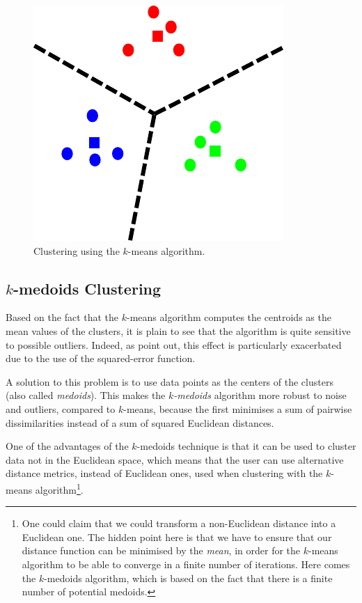 \begin{figure}[ht]
  \centering
  \includegraphics[scale=0.5]{images/kmeans.pdf}
  \caption[Clustering using the $k$-means algorithm]{Clustering using the $k$-means algorithm.}
  \label{images:kmeans}
\end{figure}


\subsection{\texorpdfstring{$k$}{k}-medoids Clustering}
\label{subsec:k-medoids}

Based on the fact that the $k$-means algorithm computes the centroids as the mean values of the clusters, it is plain to see that the algorithm is quite sensitive to possible outliers. Indeed, as  \cite{Han:2011} point out, this effect is particularly exacerbated due to the use of the squared-error function.

A solution to this problem is to use data points as the centers of the clusters (also called \textit{medoids}). This makes the \textit{$k$-medoids} algorithm more robust to noise and outliers, compared to $k$-means, because the first minimises a sum of pairwise dissimilarities instead of a sum of squared Euclidean distances.

One of the advantages of the $k$-medoids technique is that it can be used to cluster data not in the Euclidean space, which means that the user can use alternative distance metrics, instead of Euclidean ones, used when clustering with the $k$-means algorithm\footnote{One could claim that we could transform a non-Euclidean distance into a Euclidean one. The hidden point here is that we have to ensure that our distance function can be minimised by the \textit{mean}, in order for the $k$-means algorithm to be able to converge in a finite number of iterations. Here comes the $k$-medoids algorithm, which is based on the fact that there is a finite number of potential medoids.}.

